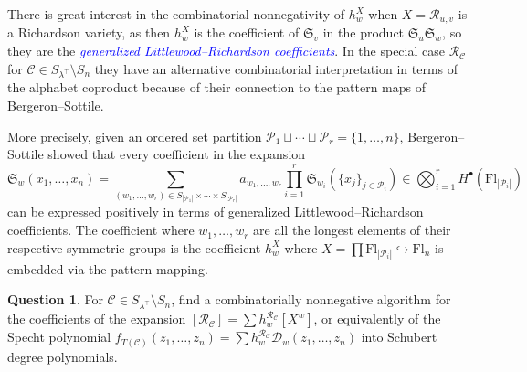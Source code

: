 \documentclass[11pt]{amsart}
\theoremstyle{definition}
\newtheorem{question}[thm]{Question}
\numberwithin{equation}{section}
\newcommand{\schub}[1]{\mathfrak{S}_{#1}} %
\newcommand{\fl}[1]{\mathrm{Fl}_{#1}}
\renewcommand\emph[1]{\textcolor{blue}{\textit{#1}}} %
\begin{document}
There is great interest in the combinatorial nonnegativity of $h^X_w$ when $X=\mathcal{R}_{u,v}$ is a Richardson variety, as then $h^X_w$ is the coefficient of $\schub{v}$ in the product $\schub{u}\schub{w}$, so they are the \emph{generalized Littlewood--Richardson coefficients}.
In the special case $\mathcal{R}_{\mathcal{C}}$ for $\mathcal{C}\in S_{\lambda^{\top}}\setminus S_n$ they have an alternative combinatorial interpretation in terms of the alphabet coproduct because of their connection to the pattern maps of Bergeron--Sottile.

More precisely, given an ordered set partition $\mathcal{P}_1\sqcup \cdots \sqcup \mathcal{P}_{r}=\{1,\ldots,n\}$, Bergeron--Sottile \cite{BS98,BS99} showed that every coefficient in the expansion
$$\schub{w}(x_1,\ldots,x_n)=\sum_{(w_1,\ldots,w_r)\in S_{|\mathcal{P}_1|}\times \cdots \times S_{|\mathcal{P}_r|}}a_{w_1,\ldots,w_r}\prod_{i=1}^r\schub{w_i}(\{x_j\}_{j\in \mathcal{P}_i})\in \bigotimes_{i=1}^r H^\bullet(\fl{|\mathcal{P}_i|})$$
can be expressed positively in terms of generalized Littlewood--Richardson coefficients.
The coefficient where $w_1,\ldots,w_r$ are all the longest elements of their respective symmetric groups is the coefficient $h^X_w$ where $X=\prod \fl{|\mathcal{P}_i|}\hookrightarrow \fl{n}$ is embedded via the pattern mapping.

\begin{question}
\label{question:RctoSchubert}
    For $\mathcal{C}\in S_{\lambda^{\top}}\setminus S_n$, find a combinatorially nonnegative algorithm for the coefficients of the expansion $[\mathcal{R}_{\mathcal{C}}]=\sum h^{\mathcal{R}_\mathcal{C}}_w[X^w]$, or equivalently of the Specht polynomial $f_{T(\mathcal{C})}(z_1,\ldots,z_n)=\sum h_w^{\mathcal{R}_{\mathcal{C}}}\mathcal{D}_w(z_1,\ldots,z_n)$ into Schubert degree polynomials.
\end{question}
\end{document}
